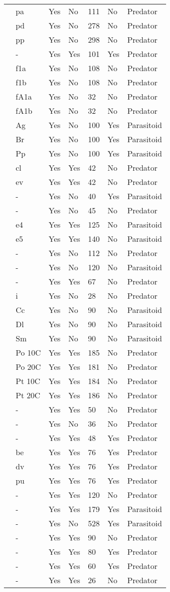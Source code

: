 \begin{table}[!tbp]
\begin{center}
\begin{tabular}{lllllll}
\citet{Eveleigh:1982aa}&pa&Yes&No&111&No&Predator\tabularnewline
\citet{Eveleigh:1982aa}&pd&Yes&No&278&No&Predator\tabularnewline
\citet{Eveleigh:1982aa}&pp&Yes&No&298&No&Predator\tabularnewline
\citet{Fussmann:2005aa}&-&Yes&Yes&101&Yes&Predator\tabularnewline
\citet{Griffen:2007aa}&f1a&Yes&No&108&No&Predator\tabularnewline
\citet{Griffen:2007aa}&f1b&Yes&No&108&No&Predator\tabularnewline
\citet{Griffen:2007aa}&fA1a&Yes&No&32&No&Predator\tabularnewline
\citet{Griffen:2007aa}&fA1b&Yes&No&32&No&Predator\tabularnewline
\citet{Hassan:1976aa}&Ag&Yes&No&100&Yes&Parasitoid\tabularnewline
\citet{Hassan:1976aa}&Br&Yes&No&100&Yes&Parasitoid\tabularnewline
\citet{Hassan:1976aa}&Pp&Yes&No&100&Yes&Parasitoid\tabularnewline
\citet{Hossie:2016aa}&cl&Yes&Yes&42&No&Predator\tabularnewline
\citet{Hossie:2016aa}&ev&Yes&Yes&42&No&Predator\tabularnewline
\citet{Huffaker:1982aa}&-&Yes&No&40&Yes&Parasitoid\tabularnewline
\citet{Johnson:2006aa}&-&Yes&No&45&No&Predator\tabularnewline
\citet{Jones:1988aa}&e4&Yes&Yes&125&No&Parasitoid\tabularnewline
\citet{Jones:1988aa}&e5&Yes&Yes&140&No&Parasitoid\tabularnewline
\citet{Katz:1985ai}&-&Yes&No&112&No&Predator\tabularnewline
\citet{Kfir:1983aa}&-&Yes&No&120&No&Parasitoid\tabularnewline
\citet{Kratina:2009aa}&-&Yes&Yes&67&No&Predator\tabularnewline
\citet{Krylov:1992aa}&i&Yes&No&28&No&Predator\tabularnewline
\citet{Kumar:1985aa}&Cc&Yes&No&90&No&Parasitoid\tabularnewline
\citet{Kumar:1985aa}&Dl&Yes&No&90&No&Parasitoid\tabularnewline
\citet{Kumar:1985aa}&Sm&Yes&No&90&No&Parasitoid\tabularnewline
\citet{Lang:2012aa}&Po 10C&Yes&Yes&185&No&Predator\tabularnewline
\citet{Lang:2012aa}&Po 20C&Yes&Yes&181&No&Predator\tabularnewline
\citet{Lang:2012aa}&Pt 10C&Yes&Yes&184&No&Predator\tabularnewline
\citet{Lang:2012aa}&Pt 20C&Yes&Yes&186&No&Predator\tabularnewline
\citet{Long:2012aa}&-&Yes&Yes&50&No&Predator\tabularnewline
\citet{Mansour:1991aa}&-&Yes&No&36&No&Predator\tabularnewline
\citet{Medoc:2013aa}&-&Yes&Yes&48&Yes&Predator\tabularnewline
\citet{Medoc:2015aa}&be&Yes&Yes&76&Yes&Predator\tabularnewline
\citet{Medoc:2015aa}&dv&Yes&Yes&76&Yes&Predator\tabularnewline
\citet{Medoc:2015aa}&pu&Yes&Yes&76&Yes&Predator\tabularnewline
\citet{Mertz:1968aa}&-&Yes&Yes&120&No&Predator\tabularnewline
\citet{Mills:2004aa}&-&Yes&Yes&179&Yes&Parasitoid\tabularnewline
\citet{Montoya:2000aa}&-&Yes&No&528&Yes&Parasitoid\tabularnewline
\citet{Omkar:2004aa}&-&Yes&Yes&90&No&Predator\tabularnewline
\citet{Prokopenko:2017aa}&-&Yes&Yes&80&Yes&Predator\tabularnewline
\citet{Pusack:2018aa}&-&Yes&Yes&60&Yes&Predator\tabularnewline
\citet{Reeve:1997aa}&-&Yes&Yes&26&No&Predator\tabularnewline

\end{tabular}
\end{center}
\end{table}
